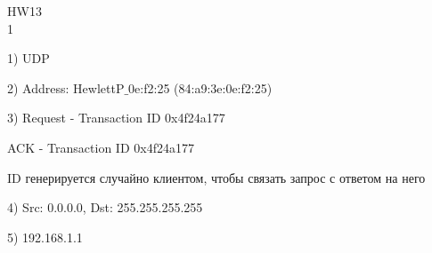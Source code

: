 \documentclass[a4paper,11pt]{article}
\begin{document}
\Large
HW13
\\
1

\begin{center}
\label{fig:image}
\end{center}
1) UDP

\begin{center}
\label{fig:image}
\end{center}
2) Address: HewlettP$\_$0e:f2:25 (84:a9:3e:0e:f2:25)

3) Request - Transaction ID 0x4f24a177

 ACK - Transaction ID 0x4f24a177
 
ID генерируется случайно клиентом, чтобы связать запрос с ответом на него

4) Src: 0.0.0.0, Dst: 255.255.255.255

5) 192.168.1.1
\end{document}
